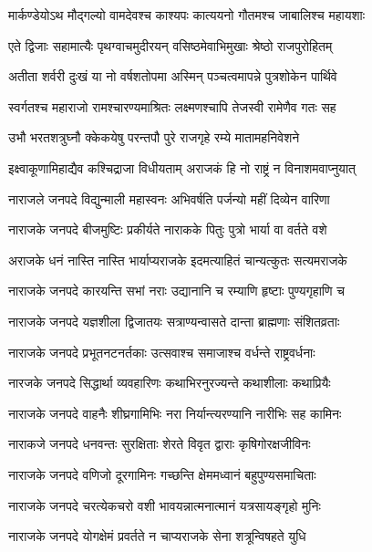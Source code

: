 \twolineshloka
{मार्कण्डेयोऽथ मौद्गल्यो वामदेवश्च काश्यपः}
{कात्ययनो गौतमश्च जाबालिश्च महायशाः} %

\twolineshloka
{एते द्विजाः सहामात्यैः पृथग्वाचमुदीरयन्}
{वसिष्ठमेवाभिमुखाः श्रेष्ठो राजपुरोहितम्} %

\twolineshloka
{अतीता शर्वरी दुःखं या नो वर्षशतोपमा}
{अस्मिन् पञ्चत्वमापन्ने पुत्रशोकेन पार्थिवे} %

\twolineshloka
{स्वर्गतश्च महाराजो रामश्चारण्यमाश्रितः}
{लक्ष्मणश्चापि तेजस्वी रामेणैव गतः सह} %

\twolineshloka
{उभौ भरतशत्रुघ्नौ क्केकयेषु परन्तपौ}
{पुरे राजगृहे रम्ये मातामहनिवेशने} %

\twolineshloka
{इक्ष्वाकूणामिहाद्यैव कश्चिद्राजा विधीयताम्}
{अराजकं हि नो राष्ट्रं न विनाशमवाप्नुयात्} %

\twolineshloka
{नाराजले जनपदे विद्युन्माली महास्वनः}
{अभिवर्षति पर्जन्यो महीं दिव्येन वारिणा} %

\twolineshloka
{नाराजके जनपदे बीजमुष्टिः प्रकीर्यते}
{नाराकके पितुः पुत्रो भार्या वा वर्तते वशे} %

\twolineshloka
{अराजके धनं नास्ति नास्ति भार्याप्यराजके}
{इदमत्याहितं चान्यत्कुतः सत्यमराजके} %

\twolineshloka
{नाराजके जनपदे कारयन्ति सभां नराः}
{उद्यानानि च रम्याणि हृष्टाः पुण्यगृहाणि च} %

\twolineshloka
{नाराजके जनपदे यज्ञशीला द्विजातयः}
{सत्राण्यन्वासते दान्ता ब्राह्मणाः संशितव्रताः} %

\twolineshloka
{नाराजके जनपदे प्रभूतनटनर्तकाः}
{उत्सवाश्च समाजाश्च वर्धन्ते राष्ट्रवर्धनाः} %

\twolineshloka
{नारजके जनपदे सिद्धार्था व्यवहारिणः}
{कथाभिरनुरज्यन्ते कथाशीलाः कथाप्रियैः} %

\twolineshloka
{नाराजके जनपदे वाहनैः शीघ्रगामिभिः}
{नरा निर्यान्त्यरण्यानि नारीभिः सह कामिनः} %

\twolineshloka
{नाराकजे जनपदे धनवन्तः सुरक्षिताः}
{शेरते विवृत द्वाराः कृषिगोरक्षजीविनः} %

\twolineshloka
{नाराजके जनपदे वणिजो दूरगामिनः}
{गच्छन्ति क्षेममध्वानं बहुपुण्यसमाचिताः} %

\twolineshloka
{नाराजके जनपदे चरत्येकचरो वशी}
{भावयन्नात्मनात्मानं यत्रसायङ्गृहो मुनिः} %

\twolineshloka
{नाराजके जनपदे योगक्षेमं प्रवर्तते}
{न चाप्यराजके सेना शत्रून्विषहते युधि} %

